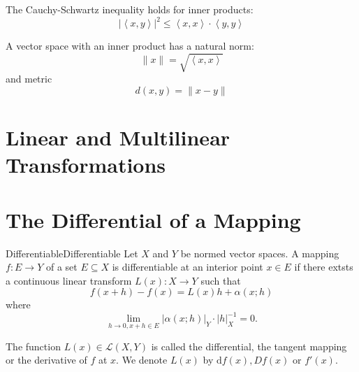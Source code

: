 \documentclass[../main.tex]{subfiles}
\begin{document}
The Cauchy-Schwartz inequality holds for inner products:
\begin{equation}
\left|\left<x,y\right>\right|^2 \leq \left<x,x\right>\cdot \left<y,y\right>
\end{equation}

A vector space with an inner product has a natural norm:
\begin{equation}
\|x\| = \sqrt{\left<x,x\right>}
\end{equation}
and metric
\begin{equation*}
d(x,y) = \|x-y\|
\end{equation*}


\section{Linear and Multilinear Transformations}


\section{The Differential of a Mapping}

\begin{definition}{Differentiable}{Differentiable}
Let $X$ and $Y$ be normed vector spaces. A mapping $f:E \rightarrow Y$ of a set $E \subseteq X$ is differentiable at an interior point $x\in E$ if there extsts a continuous linear transform $L(x): X \rightarrow Y$ such that
\begin{equation*}
f(x+h) - f(x) = L(x)h+\alpha(x;h)
\end{equation*}
where
\begin{equation*}
\lim_{h \to 0,x+h\in E} \left|\alpha(x;h)\right|_Y \cdot \left|h\right|_X^{-1} = 0.
\end{equation*}

The function $L(x)\in \mathscr{L}(X,Y)$ is called the differential, the tangent mapping or the derivative of $f$ at $x$. We denote $L(x)$ by $\mathrm{d} f(x),Df(x)$ or $f'(x)$.
\end{definition}
\end{document}
